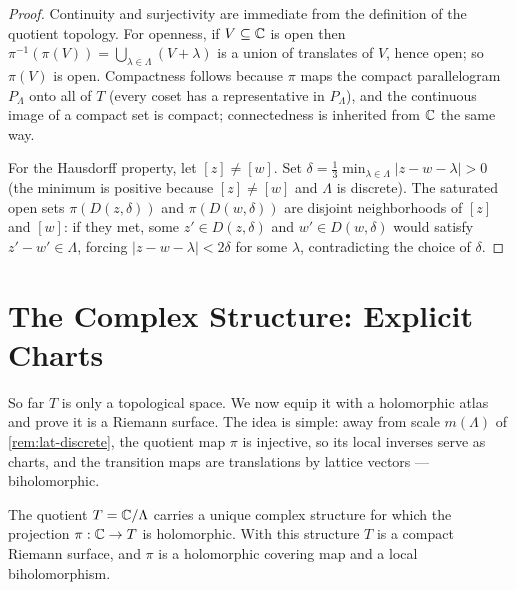 \begin{proof}
Continuity and surjectivity are immediate from the definition of the quotient
topology. For openness, if \(V \subseteq \mathbb{C}\) is open then
\(\pi^{-1}(\pi(V)) = \bigcup_{\lambda \in \Lambda} (V + \lambda)\) is a union of
translates of \(V\), hence open; so \(\pi(V)\) is open. Compactness follows
because \(\pi\) maps the compact parallelogram \(P_\Lambda\) onto all of \(T\)
(every coset has a representative in \(P_\Lambda\)), and the continuous image of
a compact set is compact; connectedness is inherited from \(\mathbb{C}\) the same way.

For the Hausdorff property, let \([z] \ne [w]\). Set \(\delta = \tfrac13
\min_{\lambda \in \Lambda}|z - w - \lambda| > 0\) (the minimum is positive
because \([z] \ne [w]\) and \(\Lambda\) is discrete). The saturated open sets
\(\pi(D(z,\delta))\) and \(\pi(D(w,\delta))\) are disjoint neighborhoods of
\([z]\) and \([w]\): if they met, some \(z' \in D(z,\delta)\) and
\(w' \in D(w,\delta)\) would satisfy \(z' - w' \in \Lambda\), forcing
\(|z - w - \lambda| < 2\delta\) for some \(\lambda\), contradicting the choice of
\(\delta\).
\end{proof}

\section{The Complex Structure: Explicit Charts}
\label{sec:lat-charts}

So far \(T\) is only a topological space. We now equip it with a holomorphic
atlas and prove it is a Riemann surface. The idea is simple: away from scale
\(m(\Lambda)\) of \cref{rem:lat-discrete}, the quotient map \(\pi\) is injective,
so its local inverses serve as charts, and the transition maps are translations
by lattice vectors --- biholomorphic.

\begin{theorem}
\label{thm:lat-riemann-surface}
The quotient \(T = \mathbb{C}/\Lambda\) carries a unique complex structure for which the
projection \(\pi : \mathbb{C} \to T\) is holomorphic. With this structure \(T\) is a
compact Riemann surface, and \(\pi\) is a holomorphic covering map and a local
biholomorphism.
\end{theorem}

